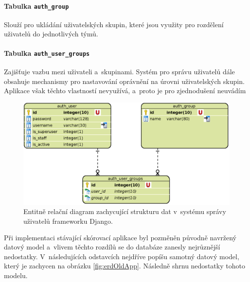 \documentclass[
  digital,
  twoside,
  table, 
  nolof, 
  nolot
]{fithesis3}
\begin{document}
\paragraph{Tabulka \texttt{auth\_group}} Slouží pro ukládání uživatelských skupin, které jsou využity pro rozdělení uživatelů do jednotlivých týmů. 

\paragraph{Tabulka \texttt{auth\_user\_groups}} Zajišťuje vazbu mezi uživateli a~skupinami. Systém pro správu uživatelů dále obsahuje mechanismy pro nastavování oprávnění na úrovni uživatelských skupin. Aplikace však těchto vlastností nevyužívá, a~proto je pro zjednodušení neuvádím

\begin{figure}[h!]
    \centering
    \includegraphics[width=12cm]{images/ERD-django.eps}
    \caption{Entitně relační diagram zachycující strukturu dat v~systému správy uživatelů frameworku Django.}
    \label{fig:erdDjango}
\end{figure}

Při implementaci stávající skórovací aplikace byl pozměněn původně navržený datový model a~vlivem těchto rozdílů se do databáze zanesly nejrůznější nedostatky. V~následujících odstavcích nejdříve popíšu samotný datový model, který je zachycen na obrázku \ref{fig:erdOldApp}. Následně shrnu nedostatky tohoto modelu. 
\end{document}
